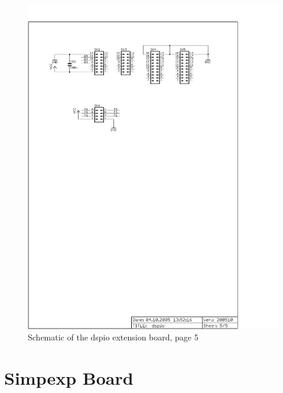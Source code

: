\begin{figure}
    \centering
    \includegraphics[scale=0.68]{appendix/dspio_p5}
    \caption{Schematic of the dspio extension board, page 5}
\end{figure}

\newpage
\section{Simpexp Board} \label{appx:simpexp}


